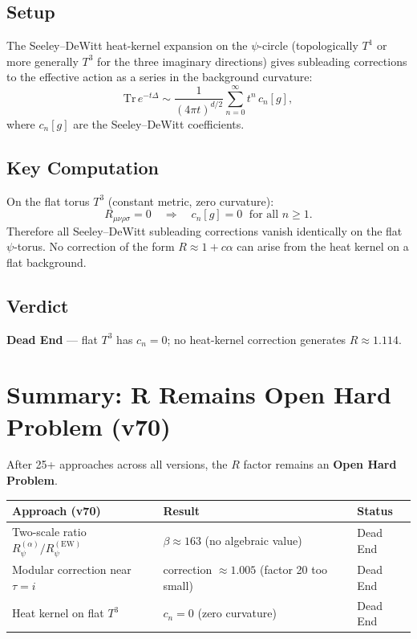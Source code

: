 \documentclass[11pt,a4paper]{article}
\theoremstyle{remark}
\begin{document}
\subsection{Setup}

The Seeley--DeWitt heat-kernel expansion on the $\psi$-circle (topologically
$T^1$ or more generally $T^3$ for the three imaginary directions) gives
subleading corrections to the effective action as a series in the background
curvature:
\begin{equation}
  \mathrm{Tr}\,e^{-t\Delta} \sim \frac{1}{(4\pi t)^{d/2}}
  \sum_{n=0}^\infty t^n\,c_n[g],
\end{equation}
where $c_n[g]$ are the Seeley--DeWitt coefficients.

\subsection{Key Computation}

On the flat torus $T^3$ (constant metric, zero curvature):
\begin{equation}
  R_{\mu\nu\rho\sigma} = 0
  \quad\Longrightarrow\quad
  c_n[g] = 0 \;\text{ for all } n \geq 1.
\end{equation}
Therefore all Seeley--DeWitt subleading corrections vanish identically on the
flat $\psi$-torus.  No correction of the form $R \approx 1 + c\alpha$ can arise
from the heat kernel on a flat background.

\subsection{Verdict}

\begin{center}
\textbf{Dead End} — flat $T^3$ has $c_n = 0$; no heat-kernel correction
generates $R \approx 1.114$.
\end{center}

\section{Summary: R Remains Open Hard Problem (v70)}
\label{sec:v70_summary}

After 25+ approaches across all versions, the $R$ factor remains an
\textbf{Open Hard Problem}.

\medskip
\begin{center}
\begin{tabular}{|l|l|l|}
\hline
\textbf{Approach (v70)} & \textbf{Result} & \textbf{Status} \\
\hline
Two-scale ratio $R_\psi^{(\alpha)}/R_\psi^{(\mathrm{EW})}$
  & $\beta \approx 163$ (no algebraic value) & Dead End \\
Modular correction near $\tau=i$
  & correction $\approx 1.005$ (factor 20 too small) & Dead End \\
Heat kernel on flat $T^3$
  & $c_n = 0$ (zero curvature) & Dead End \\
\hline
\end{tabular}
\end{center}
\end{document}
